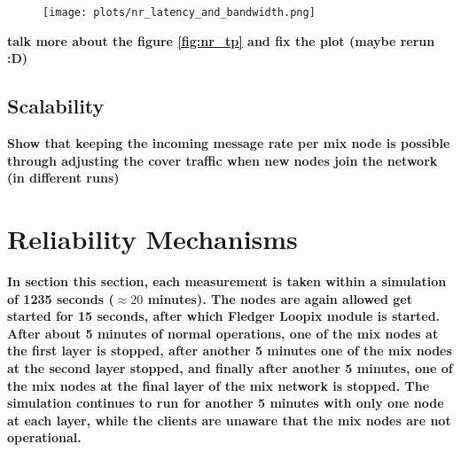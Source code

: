 \documentclass[a4paper,11pt,oneside]{report}
\begin{document}
\begin{figure}[H]
    \centering
    \texttt{[image: plots/nr\_latency\_and\_bandwidth.png]}
    \caption{}
    \label{fig:nr_tp}
\end{figure}

\textbf{talk more about the figure \autoref{fig:nr_tp} and fix the plot (maybe rerun :D)}


\subsection{Scalability}
\textbf{Show that keeping the incoming message rate per mix node is possible through adjusting the cover traffic when new nodes join the network (in different runs)}


\section{Reliability Mechanisms}
\textbf{In section this section, each measurement is taken within a simulation of 1235 seconds  (\(\approx 20\) minutes). The nodes are again allowed get started for 15 seconds, after which Fledger Loopix module is started. After about 5 minutes of normal operations, one of the mix nodes at the first layer is stopped, after another 5 minutes one of the mix nodes at the second layer stopped, and finally after another 5 minutes, one of the mix nodes at the final layer of the mix network is stopped. The simulation continues to run for another 5 minutes with only one node at each layer, while the clients are unaware that the mix nodes are not operational.}
\end{document}
